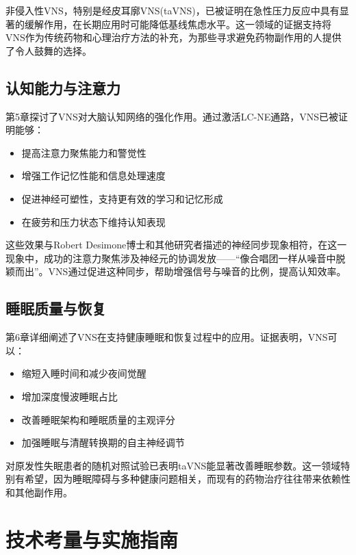 \documentclass[
  Letterpaper,
]{scrbook}
\providecommand{\tightlist}{%
  \setlength{\itemsep}{0pt}\setlength{\parskip}{0pt}}\usepackage{longtable,booktabs,array}
\begin{document}
非侵入性VNS，特别是经皮耳廓VNS(taVNS)，已被证明在急性压力反应中具有显著的缓解作用，在长期应用时可能降低基线焦虑水平。这一领域的证据支持将VNS作为传统药物和心理治疗方法的补充，为那些寻求避免药物副作用的人提供了令人鼓舞的选择。

\subsection{认知能力与注意力}\label{ux8ba4ux77e5ux80fdux529bux4e0eux6ce8ux610fux529b}

第5章探讨了VNS对大脑认知网络的强化作用。通过激活LC-NE通路，VNS已被证明能够：

\begin{itemize}
\tightlist
\item
  提高注意力聚焦能力和警觉性
\item
  增强工作记忆性能和信息处理速度
\item
  促进神经可塑性，支持更有效的学习和记忆形成
\item
  在疲劳和压力状态下维持认知表现
\end{itemize}

这些效果与Robert
Desimone博士和其他研究者描述的神经同步现象相符，在这一现象中，成功的注意力聚焦涉及神经元的协调发放------``像合唱团一样从噪音中脱颖而出''。VNS通过促进这种同步，帮助增强信号与噪音的比例，提高认知效率。

\subsection{睡眠质量与恢复}\label{ux7761ux7720ux8d28ux91cfux4e0eux6062ux590d}

第6章详细阐述了VNS在支持健康睡眠和恢复过程中的应用。证据表明，VNS可以：

\begin{itemize}
\tightlist
\item
  缩短入睡时间和减少夜间觉醒
\item
  增加深度慢波睡眠占比
\item
  改善睡眠架构和睡眠质量的主观评分
\item
  加强睡眠与清醒转换期的自主神经调节
\end{itemize}

对原发性失眠患者的随机对照试验已表明taVNS能显著改善睡眠参数。这一领域特别有希望，因为睡眠障碍与多种健康问题相关，而现有的药物治疗往往带来依赖性和其他副作用。

\section{技术考量与实施指南}\label{ux6280ux672fux8003ux91cfux4e0eux5b9eux65bdux6307ux5357}
\end{document}
